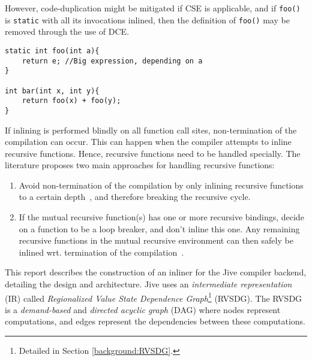 However, code-duplication might be mitigated if CSE is applicable, and if
\lstinline!foo()! is \lstinline!static! with all its invocations inlined, then
the definition of \lstinline!foo()! may be removed through the use of DCE.

\begin{centering}
	\noindent\begin{minipage}{\textwidth}
		\begin{CenteredBox}
		\begin{lstlisting}[style=global_customcpp]
static int foo(int a){
	return e; //Big expression, depending on a
}

int bar(int x, int y){
	return foo(x) + foo(y);
}
		\end{lstlisting}
		\end{CenteredBox}
	\end{minipage}
	\label{lst:code-dup}
\end{centering}

If inlining is performed blindly on all function call sites, non-termination of
the compilation can occur. This can happen when the compiler attempts to inline
recursive functions. Hence, recursive functions need to be handled specially.
The literature proposes two main approaches for handling recursive functions:

\begin{enumerate}

	\item Avoid non-termination of the compilation by only inlining recursive
functions to a certain depth~\cite{GHCPaper}\cite{InlineWhenHowSerrano}, and
therefore breaking the recursive cycle.

	\item If the mutual recursive function(s) has one or more recursive
bindings, decide on a function to be a loop breaker, and don't inline this one.
Any remaining recursive functions in the mutual recursive environment can then
safely be inlined wrt. termination of the
compilation~\cite{BasMscThesis}\cite{GHCPaper}.

\end{enumerate}

This report describes the construction of an inliner for the Jive compiler
backend, detailing the design and architecture. Jive uses an
\textit{intermediate representation} (IR) called \textit{Regionalized Value
State Dependence Graph}\footnote{Detailed in Section \ref{background:RVSDG}.}
(RVSDG). The RVSDG~\cite{RVSDG:HiPEACpaper} is a \textit{demand-based} and
\textit{directed acyclic graph} (DAG) where nodes represent computations, and
edges represent the dependencies between these computations.

